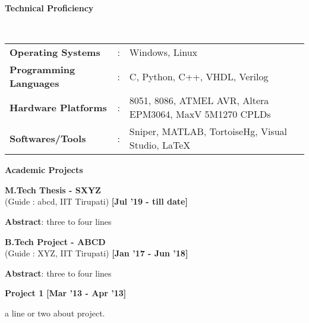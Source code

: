 \documentclass[a4paper,10pt]{article}
\begin{document}
\colorbox{titleColor}{\parbox{6.7in}{\textbf{Technical Proficiency}}}\\

\begin{tabular}{p{1.6in}p{0.1in}p{4.5in}}
  \textbf{\small{Operating Systems}} &: &{{Windows, Linux}} \\
  
  \textbf{\small{Programming Languages}} &: &{{C, Python, C++, VHDL, Verilog}} \\
  \textbf{\small{Hardware Platforms}} &: &{{8051, 8086, ATMEL AVR, Altera EPM3064, MaxV 5M1270 CPLDs}} \\
  \textbf{\small{Softwares/Tools}} &: &{{Sniper, MATLAB, TortoiseHg, Visual Studio, \LaTeX}} \\
\end{tabular}


\colorbox{titleColor}{\parbox{6.7in}{\textbf{Academic Projects}}}
\begin{itemize*}
  \setlength{\itemsep}{1pt}
  \item \textbf{M.Tech Thesis - SXYZ}  \\
{(Guide : abcd, IIT Tirupati)} \hfill {\small{{\textbf{[Jul '19 - till date]}}\/}}
\begin{itemize*}
  \setlength{\itemsep}{.00pt}
      \item \textbf{Abstract}: three to four lines
\end{itemize*}
\end{itemize*}

\begin{itemize*}
  \setlength{\itemsep}{1pt}
  \item \textbf{B.Tech Project - ABCD} \\
{(Guide : XYZ, IIT Tirupati)}  \hfill {\small{{\textbf{[Jan '17 - Jun '18]}}\/}}
\begin{itemize*}

  \setlength{\itemsep}{.00pt}
      \item \textbf{Abstract}: three to four lines
\end{itemize*}
\end{itemize*}


\begin{itemize*}
  \setlength{\itemsep}{1pt}
  \item \textbf{\small{Project 1}} \hfill {\small{{\textbf{[Mar '13 - Apr '13]}}}\/} 
\begin{itemize*}
	\item a line or two about project.
\end{itemize*}
\end{itemize*}
\end{document}
